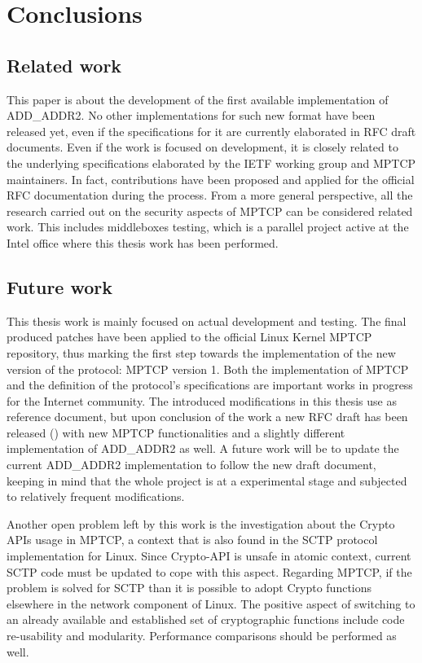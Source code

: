 \chapter{Conclusions}
\label{chap:conclusions}

\section{Related work}
This paper is about the development of the first available implementation of ADD\_ADDR2. No other implementations for such new format have been released yet, even if the specifications for it are currently elaborated in RFC draft documents. Even if the work is focused on development, it is closely related to the underlying specifications elaborated by the IETF working group and MPTCP maintainers. In fact, contributions have been proposed and applied for the official RFC documentation during the process. From a more general perspective, all the research carried out on the security aspects of MPTCP can be considered related work. This includes middleboxes testing, which is a parallel project active at the Intel office where this thesis work has been performed. 

\section{Future work}
\label{future}
This thesis work is mainly focused on actual development and testing. The final produced patches have been applied to the official Linux Kernel MPTCP repository, thus marking the first step towards the implementation of the new version of the protocol: MPTCP version 1. 
Both the implementation of MPTCP and the definition of the protocol's specifications are important works in progress for the Internet community. The introduced modifications in this thesis use  as reference document, but upon conclusion of the work a new RFC draft has been released () with new MPTCP functionalities and a slightly different implementation of ADD\_ADDR2 as well. A future work will be to update the current ADD\_ADDR2 implementation to follow the new draft document, keeping in mind that the whole project is at a experimental stage and subjected to relatively frequent modifications.

Another open problem left by this work is the investigation about the Crypto APIs usage in MPTCP, a context that is also found in the SCTP protocol implementation for Linux. Since Crypto-API is unsafe in atomic context, current SCTP code must be updated to cope with this aspect. Regarding MPTCP, if the problem is solved for SCTP than it is possible to adopt Crypto functions elsewhere in the network component of Linux. The positive aspect of switching to an already available and established set of cryptographic functions include code re-usability and modularity. Performance comparisons should be performed as well.

